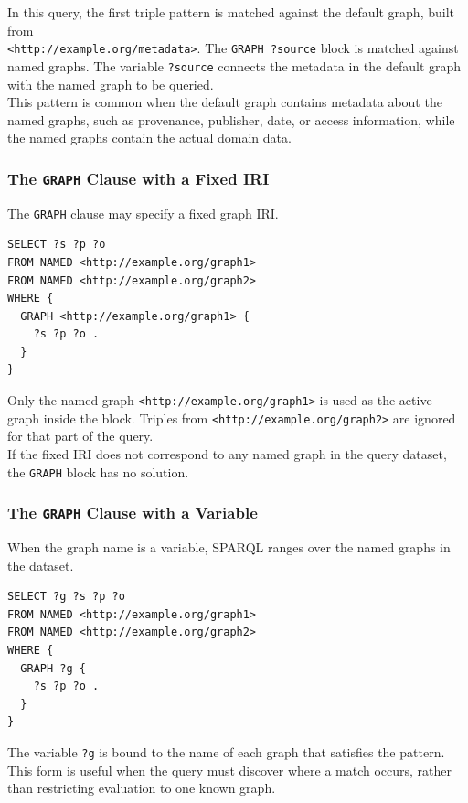 \documentclass{scrbook}
\begin{document}
	In this query, the first triple pattern is matched against the default graph, built from\\
	\texttt{<http://example.org/metadata>}. The \texttt{GRAPH ?source} block is matched against named graphs. The variable \texttt{?source} connects the metadata in the default graph with the named graph to be queried.\\
	
	This pattern is common when the default graph contains metadata about the named graphs, such as provenance, publisher, date, or access information, while the named graphs contain the actual domain data.
	
	\subsubsection{The \texttt{GRAPH} Clause with a Fixed IRI}
	
	The \texttt{GRAPH} clause may specify a fixed graph IRI.
	
	\begin{lstlisting}
SELECT ?s ?p ?o
FROM NAMED <http://example.org/graph1>
FROM NAMED <http://example.org/graph2>
WHERE {
  GRAPH <http://example.org/graph1> {
    ?s ?p ?o .
  }
}
	\end{lstlisting}
	
	Only the named graph \texttt{<http://example.org/graph1>} is used as the active graph inside the block. Triples from \texttt{<http://example.org/graph2>} are ignored for that part of the query.\\
	
	If the fixed IRI does not correspond to any named graph in the query dataset, the \texttt{GRAPH} block has no solution.
	
	\subsubsection{The \texttt{GRAPH} Clause with a Variable}
	
	When the graph name is a variable, SPARQL ranges over the named graphs in the dataset.
	
	\begin{lstlisting}
SELECT ?g ?s ?p ?o
FROM NAMED <http://example.org/graph1>
FROM NAMED <http://example.org/graph2>
WHERE {
  GRAPH ?g {
    ?s ?p ?o .
  }
}
	\end{lstlisting}
	
	The variable \texttt{?g} is bound to the name of each graph that satisfies the pattern. This form is useful when the query must discover where a match occurs, rather than restricting evaluation to one known graph.\\
	
\end{document}
